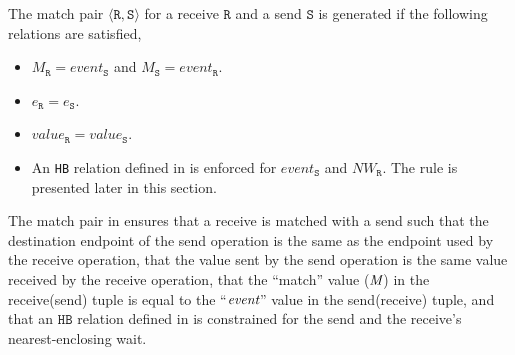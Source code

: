 \begin{definition}
The match pair $\langle\mathtt{R}, \mathtt{S}\rangle$ for a receive $\mathtt{R}$ and a send $\mathtt{S}$ is generated if the following relations are satisfied,
\begin{itemize}
\item $M_{\mathtt{R}} = event_{\mathtt{S}}$ and $M_{\mathtt{S}} = event_{\mathtt{R}}$.
\item $e_{\mathtt{R}} = e_{\mathtt{S}}$.
\item $value_{\mathtt{R}} = value_{\mathtt{S}}$.
\item An \texttt{HB} relation defined in  is enforced for $event_{\mathtt{S}}$ and $NW_{\mathtt{R}}$. The rule is presented later in this section.
\end{itemize}
\label{def:match}
\end{definition}
The match pair in  ensures that a receive is matched with a send such that the destination endpoint of the send operation is the same as the endpoint used by the receive operation, that the value sent by the send operation is the same value received by the receive operation, that the ``match'' value ($\emph{M}$) in the receive(send) tuple is equal to the ``$\emph{event}$'' value in the send(receive) tuple, and that an $\mathtt{HB}$ relation defined in  is constrained for the send and the receive's nearest-enclosing wait.

